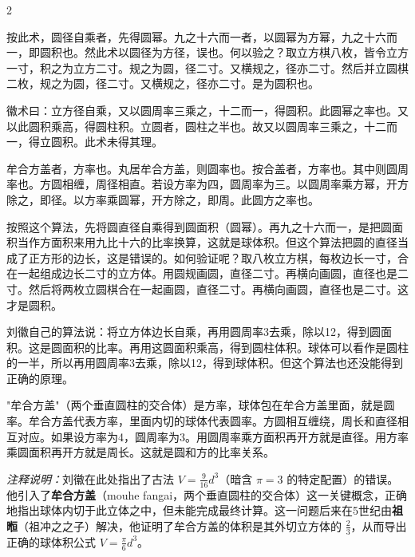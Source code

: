 \documentclass[11pt,a4paper]{article}
\begin{document}
\vspace{0.2cm}

\begin{paracol}{2}

\begin{commentarybox}
按此术，圆径自乘者，先得圆幂。九之十六而一者，以圆幂为方幂，九之十六而一，即圆积也。然此术以圆径为方径，误也。何以验之？取立方棋八枚，皆令立方一寸，积之为立方二寸。规之为圆，径二寸。又横规之，径亦二寸。然后并立圆棋二枚，规之为圆，径二寸。又横规之，径亦二寸。是为圆积也。

徽术曰：立方径自乘，又以圆周率三乘之，十二而一，得圆积。此圆幂之率也。又以此圆积乘高，得圆柱积。立圆者，圆柱之半也。故又以圆周率三乘之，十二而一，得立圆积。此术未得其理。

牟合方盖者，方率也。丸居牟合方盖，则圆率也。按合盖者，方率也。其中则圆周率也。方圆相缠，周径相直。若设方率为四，圆周率为三。以圆周率乘方幂，开方除之，即径。以方率乘圆幂，开方除之，即周。此圆方之率也。
\end{commentarybox}

\switchcolumn

\begin{commentarybox}
按照这个算法，先将圆直径自乘得到圆面积（圆幂）。再九之十六而一，是把圆面积当作方面积来用九比十六的比率换算，这就是球体积。但这个算法把圆的直径当成了正方形的边长，这是错误的。如何验证呢？取八枚立方棋，每枚边长一寸，合在一起组成边长二寸的立方体。用圆规画圆，直径二寸。再横向画圆，直径也是二寸。然后将两枚立圆棋合在一起画圆，直径二寸。再横向画圆，直径也是二寸。这才是圆积。

刘徽自己的算法说：将立方体边长自乘，再用圆周率3去乘，除以12，得到圆面积。这是圆面积的比率。再用这圆面积乘高，得到圆柱体积。球体可以看作是圆柱的一半，所以再用圆周率3去乘，除以12，得到球体积。但这个算法也还没能得到正确的原理。

"牟合方盖"（两个垂直圆柱的交合体）是方率，球体包在牟合方盖里面，就是圆率。牟合方盖代表方率，里面内切的球体代表圆率。方圆相互缠绕，周长和直径相互对应。如果设方率为4，圆周率为3。用圆周率乘方面积再开方就是直径。用方率乘圆面积再开方就是周长。这就是圆和方的比率关系。
\end{commentarybox}

\end{paracol}

\textit{注释说明：}刘徽在此处指出了古法 $V = \frac{9}{16}d^3$（暗含 $\pi = 3$ 的特定配置）的错误。他引入了\textbf{牟合方盖}（mouhe fangai，两个垂直圆柱的交合体）这一关键概念，正确地指出球体内切于此立体之中，但未能完成最终计算。这一问题后来在5世纪由\textbf{祖暅}（祖冲之之子）解决，他证明了牟合方盖的体积是其外切立方体的 $\frac{2}{3}$，从而导出正确的球体积公式 $V = \frac{\pi}{6}d^3$。
\end{document}
